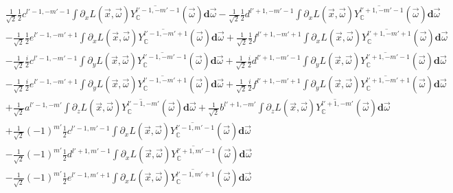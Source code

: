 \begin{align*}
&
\frac{1}{\sqrt{2}}\frac{1}{2}c^{{l'-1,-m'-1}}\int{\partial_xL\left (\vec{x} ,\vec{\omega} \right )\overline{Y_{\mathbb{C}}^{l'-1, -m'-1}}(\vec{\omega} )\mathbf{d}\vec{\omega}}
-\frac{1}{\sqrt{2}}\frac{1}{2}d^{{l'+1,-m'-1}}\int{\partial_xL\left (\vec{x} ,\vec{\omega} \right )\overline{Y_{\mathbb{C}}^{l'+1, -m'-1}}(\vec{\omega} )\mathbf{d}\vec{\omega}}
\\&
-\frac{1}{\sqrt{2}}\frac{1}{2}e^{{l'-1,-m'+1}}\int{\partial_xL\left (\vec{x} ,\vec{\omega} \right )\overline{Y_{\mathbb{C}}^{l'-1, -m'+1}}(\vec{\omega} )\mathbf{d}\vec{\omega}}
+\frac{1}{\sqrt{2}}\frac{1}{2}f^{{l'+1,-m'+1}}\int{\partial_xL\left (\vec{x} ,\vec{\omega} \right )\overline{Y_{\mathbb{C}}^{l'+1, -m'+1}}(\vec{\omega} )\mathbf{d}\vec{\omega}}
\\&
-\frac{1}{\sqrt{2}}\frac{i}{2}c^{{l'-1,-m'-1}}\int{\partial_yL\left (\vec{x} ,\vec{\omega} \right )\overline{Y_{\mathbb{C}}^{l'-1, -m'-1}}(\vec{\omega} )\mathbf{d}\vec{\omega}}
+\frac{1}{\sqrt{2}}\frac{i}{2}d^{{l'+1,-m'-1}}\int{\partial_yL\left (\vec{x} ,\vec{\omega} \right )\overline{Y_{\mathbb{C}}^{l'+1, -m'-1}}(\vec{\omega} )\mathbf{d}\vec{\omega}}
\\&
-\frac{1}{\sqrt{2}}\frac{i}{2}e^{{l'-1,-m'+1}}\int{\partial_yL\left (\vec{x} ,\vec{\omega} \right )\overline{Y_{\mathbb{C}}^{l'-1, -m'+1}}(\vec{\omega} )\mathbf{d}\vec{\omega}}
+\frac{1}{\sqrt{2}}\frac{i}{2}f^{{l'+1,-m'+1}}\int{\partial_yL\left (\vec{x} ,\vec{\omega} \right )\overline{Y_{\mathbb{C}}^{l'+1, -m'+1}}(\vec{\omega} )\mathbf{d}\vec{\omega}}
\\&
+\frac{1}{\sqrt{2}}a^{{l'-1,-m'}}\int{\partial_zL\left (\vec{x} ,\vec{\omega} \right )\overline{Y_{\mathbb{C}}^{l'-1, -m'}}(\vec{\omega} )\mathbf{d}\vec{\omega}}
+\frac{1}{\sqrt{2}}b^{{l'+1,-m'}}\int{\partial_zL\left (\vec{x} ,\vec{\omega} \right )\overline{Y_{\mathbb{C}}^{l'+1, -m'}}(\vec{\omega} )\mathbf{d}\vec{\omega}}
\\&
+\frac{1}{\sqrt{2}}\left({-1}\right)^{m'}\frac{1}{2}c^{{l'-1,m'-1}}\int{\partial_xL\left (\vec{x} ,\vec{\omega} \right )\overline{Y_{\mathbb{C}}^{l'-1, m'-1}}(\vec{\omega} )\mathbf{d}\vec{\omega}}
\\&
-\frac{1}{\sqrt{2}}\left({-1}\right)^{m'}\frac{1}{2}d^{{l'+1,m'-1}}\int{\partial_xL\left (\vec{x} ,\vec{\omega} \right )\overline{Y_{\mathbb{C}}^{l'+1, m'-1}}(\vec{\omega} )\mathbf{d}\vec{\omega}}
\\&
-\frac{1}{\sqrt{2}}\left({-1}\right)^{m'}\frac{1}{2}e^{{l'-1,m'+1}}\int{\partial_xL\left (\vec{x} ,\vec{\omega} \right )\overline{Y_{\mathbb{C}}^{l'-1, m'+1}}(\vec{\omega} )\mathbf{d}\vec{\omega}}

\end{align*}
